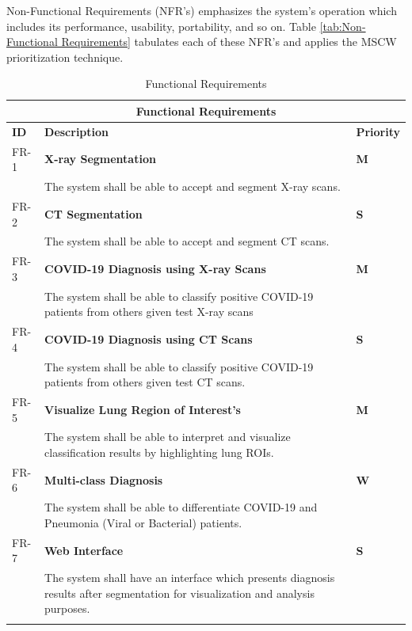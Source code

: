 Non-Functional Requirements (NFR's) emphasizes the system's operation which includes its performance, usability, portability, and so on. Table \ref{tab:Non-Functional Requirements} tabulates each of these NFR's and applies the MSCW prioritization technique.

\begin{longtable}{| p{} | p{} | p{} |} 
\hline
\multicolumn{3}{|c|}{\textbf{Functional Requirements}}\\
\hline
\textbf{ID} & \textbf{Description} & \textbf{Priority}  \\
\hline
FR-1 & \textbf{X-ray Segmentation}  & \cellcolor{green}\textbf{M} \\ &  The system shall be able to accept and segment X-ray scans. & \cellcolor{green} \\ \hline 
FR-2 & \textbf{CT Segmentation}  & \cellcolor{cyan}\textbf{S} \\ &  The system shall be able to accept and segment CT scans. & \cellcolor{cyan} \\ \hline 
FR-3 & \textbf{COVID-19 Diagnosis using X-ray Scans}  & \cellcolor{green}\textbf{M} \\ & The system shall be able to classify positive COVID-19 patients from others given test X-ray scans & \cellcolor{green} \\ \hline 
FR-4 & \textbf{COVID-19 Diagnosis using CT Scans}  & \cellcolor{cyan}\textbf{S} \\ &  The system shall be able to classify positive COVID-19 patients from others given test CT scans. & \cellcolor{cyan} \\ \hline
FR-5 & \textbf{Visualize Lung Region of Interest's}  & \cellcolor{green}\textbf{M} \\ &  The system shall be able to interpret and visualize classification results by highlighting lung ROIs. & \cellcolor{green} \\ \hline 
FR-6 & \textbf{Multi-class Diagnosis}  & \cellcolor{pink}\textbf{W} \\ &  The system shall be able to differentiate COVID-19 and Pneumonia (Viral or Bacterial) patients. & \cellcolor{pink} \\ \hline 
FR-7 & \textbf{Web Interface}  & \cellcolor{cyan}\textbf{S} \\ &  The system shall have an interface which presents diagnosis results after segmentation for visualization and analysis purposes. & \cellcolor{cyan} \\ \hline

\caption{Functional Requirements}

  \label{tab:Functional Requirements}
  \end{longtable}

